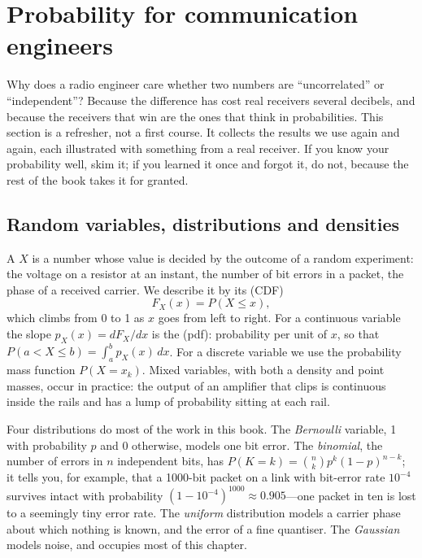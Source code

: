 \section{Probability for communication engineers}
\label{sec:ch03:prob}

Why does a radio engineer care whether two numbers are ``uncorrelated'' or ``independent''? Because
the difference has cost real receivers several decibels, and because the receivers that win are
the ones that think in probabilities. This section is a refresher, not a first course. It collects
the results we use again and again, each illustrated with something from a real receiver. If you
know your probability well, skim it; if you learned it once and forgot it, do not, because the rest
of the book takes it for granted.

\subsection{Random variables, distributions and densities}

A  $X$ is a number whose value is decided by the outcome of a random
experiment: the voltage on a resistor at an instant, the number of bit errors in a packet, the
phase of a received carrier. We describe it by its  (CDF)
\begin{equation}
F_X(x)=P(X\le x),
\end{equation}
which climbs from 0 to 1 as $x$ goes from left to right. For a continuous variable the slope
$p_X(x)=dF_X/dx$ is the  (pdf): probability per unit of $x$, so
that $P(a<X\le b)=\int_a^b p_X(x)\,dx$. For a discrete variable we use the probability mass
function $P(X=x_k)$. Mixed variables, with both a density and point masses, occur in practice: the
output of an amplifier that clips is continuous inside the rails and has a lump of probability
sitting at each rail.

Four distributions do most of the work in this book. The \emph{Bernoulli} variable, 1 with
probability $p$ and 0 otherwise, models one bit error. The \emph{binomial}, the number of errors in
$n$ independent bits, has $P(K=k)=\binom nk p^k(1-p)^{n-k}$; it tells you, for example, that a
1000-bit packet on a link with bit-error rate $10^{-4}$ survives intact with probability
$(1-10^{-4})^{1000}\approx0.905$---one packet in ten is lost to a seemingly tiny error rate. The
\emph{uniform} distribution models a carrier phase about which nothing is known, and the error of
a fine quantiser. The \emph{Gaussian} models noise, and occupies most of this chapter.

